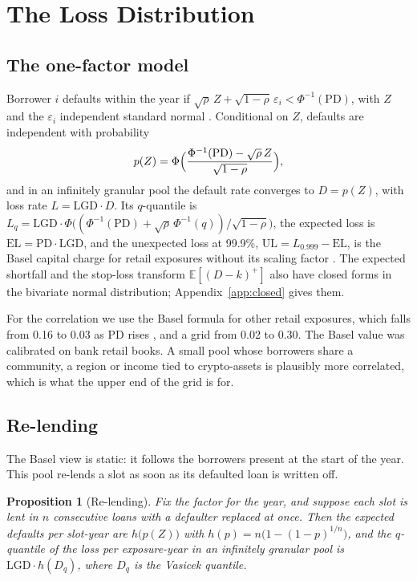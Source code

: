 \documentclass[11pt]{article}
\theoremstyle{plain}
\newtheorem{proposition}{Proposition}
\theoremstyle{definition}
\newcommand{\E}{\mathbb{E}}
\newcommand{\EL}{\mathrm{EL}}
\newcommand{\UL}{\mathrm{UL}}
\begin{document}
\section{The Loss Distribution}\label{sec:losses}

\subsection{The one-factor model}

Borrower $i$ defaults within the year if $\sqrt{\rho}\,Z+\sqrt{1-\rho}\,\varepsilon_i<\Phi^{-1}(\mathrm{PD})$,
with $Z$ and the $\varepsilon_i$ independent standard normal \citep{merton1974,vasicek2002}.
Conditional on $Z$, defaults are independent with probability
\[
  p(Z)=\Phi\Bigl(\frac{\Phi^{-1}(\mathrm{PD})-\sqrt{\rho}\,Z}{\sqrt{1-\rho}}\Bigr),
\]
and in an infinitely granular pool the default rate converges to $D=p(Z)$, with loss rate
$L=\mathrm{LGD}\cdot D$. Its $q$-quantile is
$L_q=\mathrm{LGD}\cdot\Phi\bigl((\Phi^{-1}(\mathrm{PD})+\sqrt{\rho}\,\Phi^{-1}(q))/\sqrt{1-\rho}\bigr)$,
the expected loss is $\EL=\mathrm{PD}\cdot\mathrm{LGD}$, and the unexpected loss at 99.9\%,
$\UL=L_{0.999}-\EL$, is the Basel capital charge for retail exposures without its scaling factor
\citep{gordy2003,bcbs2005}. The expected shortfall and the stop-loss transform $\E[(D-k)^+]$ also
have closed forms in the bivariate normal distribution; Appendix~\ref{app:closed} gives them.

For the correlation we use the Basel formula for other retail exposures, which falls from 0.16 to
0.03 as PD rises \citep{bcbs2006}, and a grid from 0.02 to 0.30. The Basel value was calibrated on
bank retail books. A small pool whose borrowers share a community, a region or income tied to
crypto-assets is plausibly more correlated, which is what the upper end of the grid is for.

\subsection{Re-lending}

The Basel view is static: it follows the borrowers present at the start of the year. This pool
re-lends a slot as soon as its defaulted loan is written off.

\begin{proposition}[Re-lending]\label{prop:replenish}
Fix the factor for the year, and suppose each slot is lent in $n$ consecutive loans with a defaulter
replaced at once. Then the expected defaults per slot-year are $h\bigl(p(Z)\bigr)$ with
$h(p)=n\bigl(1-(1-p)^{1/n}\bigr)$, and the $q$-quantile of the loss per exposure-year in an infinitely
granular pool is $\mathrm{LGD}\cdot h(D_q)$, where $D_q$ is the Vasicek quantile.
\end{proposition}
\end{document}
